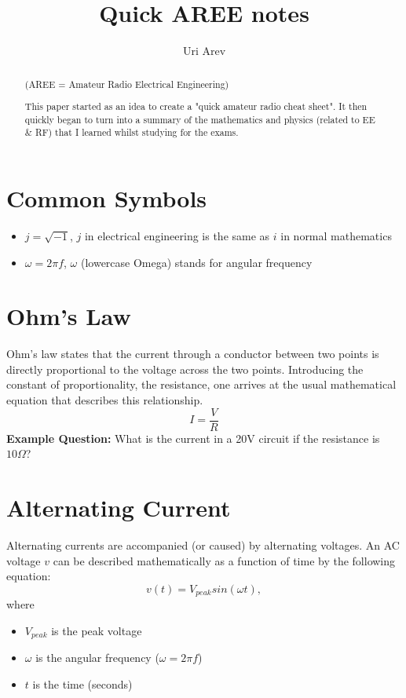 \documentclass[12pt,a4paper,oneside]{article}
\author{Uri Arev}
\title{Quick AREE notes}
\date{}
\begin{document}
\maketitle
\tableofcontents
\begin{abstract}
	\begin{center}
		(AREE = Amateur Radio Electrical Engineering)
	\end{center}

	This paper started as an idea to create a "quick amateur radio cheat sheet". It then quickly began to turn into a summary of the mathematics and physics (related to EE \& RF) that I learned whilst studying for the exams.
\end{abstract}
\section{Common Symbols}
\begin{itemize}
	\item \(j = \sqrt{-1}\), \(j\) in electrical engineering is the same as \(i\) in normal mathematics
	\item \(\omega = 2 \pi f\), \(\omega\) (lowercase Omega) stands for angular frequency
\end{itemize}
\section{Ohm's Law}
Ohm's law states that the current through a conductor between two points is directly proportional to the voltage across the two points. Introducing the constant of proportionality, the resistance, one arrives at the usual mathematical equation that describes this relationship.
\[
	I = \frac VR
\]
\textbf{Example Question:} What is the current in a 20V circuit if the resistance is \(10\Omega\)?
\section{Alternating Current}
Alternating currents are accompanied (or caused) by alternating voltages. An AC voltage \(v\) can be described mathematically as a function of time by the following equation:
\[
	v(t) = V_{peak} sin(\omega t),
\]
where
\begin{itemize}
	\item \(V_{peak}\) is the peak voltage
	\item \(\omega\) is the angular frequency (\(\omega = 2 \pi f\))
	\item \(t\) is the time (seconds)
\end{itemize}
\end{document}
